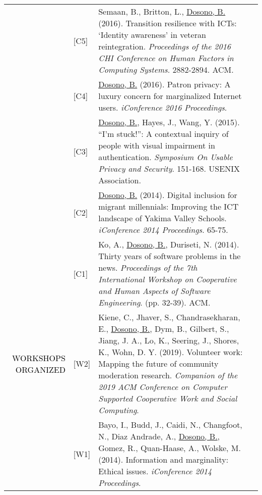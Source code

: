 \documentclass[12pt]{article}
\begin{document}
{{\begin{longtable}{Rp{1.0in}p{0.25in}p{4.75in}}
& \footnotesize{[C5]} & Semaan, B., Britton, L., \href{https://dl.acm.org/authorize?N41455}{{Dosono, B.}} (2016). Transition resilience with ICTs: `Identity awareness' in veteran reintegration. \textit{Proceedings of the 2016 CHI Conference on Human Factors in Computing Systems}. 2882-2894. ACM. \\

& \footnotesize{[C4]} & \href{https://doi.org/10.9776/16285}{{Dosono, B.}} (2016). Patron privacy: A luxury concern for marginalized Internet users. \textit{iConference 2016 Proceedings}. \\

& \footnotesize{[C3]} & \href{https://www.usenix.org/conference/soups2015/proceedings/presentation/dosono}{{Dosono, B.}}, Hayes, J., Wang, Y. (2015). ``I'm stuck!'': A contextual inquiry of people with visual impairment in authentication. \textit{Symposium On Usable Privacy and Security}. 151-168. USENIX Association. \\

& \footnotesize{[C2]} & \href{https://doi.org/10.9776/14043}{{Dosono, B.}} (2014). Digital inclusion for migrant millennials: Improving the ICT landscape of Yakima Valley Schools. \textit{iConference 2014 Proceedings}. 65-75. \\

& \footnotesize{[C1]} & Ko, A., \href{https://dl.acm.org/authorize?N41457}{{Dosono, B.}}, Duriseti, N. (2014). Thirty years of software problems in the news. \textit{Proceedings of the 7th International Workshop on Cooperative and Human Aspects of Software Engineering}. (pp. 32-39). ACM. \\

\textcolor{black}{\footnotesize{\uppercase{Workshops Organized}}} 

& \footnotesize{[W2]} & Kiene, C., Jhaver, S., Chandrasekharan, E.,  \href{https://sites.google.com/view/cscw2019modworkshop/}{{Dosono, B.}}, Dym, B., Gilbert, S., Jiang, J. A., Lo, K., Seering, J., Shores, K., Wohn, D. Y. (2019). Volunteer work: Mapping the future of community moderation research. \textit{Companion of the 2019 ACM Conference on Computer Supported Cooperative Work and Social Computing}. \\

& \footnotesize{[W1]} & Bayo, I., Budd, J., Caidi, N., Changfoot, N., Diaz Andrade, A., \href{https://doi.org/10.9776/14223}{{Dosono, B.}}, Gomez, R., Quan-Haase, A., Wolske, M. (2014). Information and marginality: Ethical issues. \textit{iConference 2014 Proceedings}. \\


\end{longtable}}}
\end{document}
